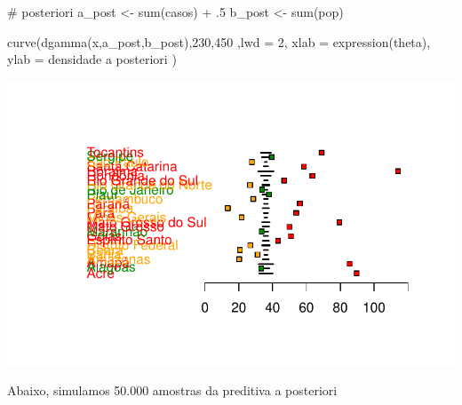\documentclass[
  letterpaper,
  DIV=11,
  numbers=noendperiod]{scrreprt}
\newenvironment{Shaded}{\begin{snugshade}}{\end{snugshade}}
\newcommand{\AttributeTok}[1]{\textcolor[rgb]{0.40,0.45,0.13}{#1}}
\newcommand{\CommentTok}[1]{\textcolor[rgb]{0.37,0.37,0.37}{#1}}
\newcommand{\DecValTok}[1]{\textcolor[rgb]{0.68,0.00,0.00}{#1}}
\newcommand{\FunctionTok}[1]{\textcolor[rgb]{0.28,0.35,0.67}{#1}}
\newcommand{\NormalTok}[1]{\textcolor[rgb]{0.00,0.23,0.31}{#1}}
\newcommand{\OtherTok}[1]{\textcolor[rgb]{0.00,0.23,0.31}{#1}}
\newcommand{\SpecialCharTok}[1]{\textcolor[rgb]{0.37,0.37,0.37}{#1}}
\newcommand{\StringTok}[1]{\textcolor[rgb]{0.13,0.47,0.30}{#1}}
\theoremstyle{definition}
\theoremstyle{definition}
\theoremstyle{plain}
\theoremstyle{remark}
\begin{document}
\begin{Shaded}
\begin{Highlighting}[]
\CommentTok{\# posteriori}
\NormalTok{a\_post }\OtherTok{\textless{}{-}} \FunctionTok{sum}\NormalTok{(casos) }\SpecialCharTok{+}\NormalTok{ .}\DecValTok{5}
\NormalTok{b\_post }\OtherTok{\textless{}{-}} \FunctionTok{sum}\NormalTok{(pop)}

\FunctionTok{curve}\NormalTok{(}\FunctionTok{dgamma}\NormalTok{(x,a\_post,b\_post),}\DecValTok{230}\NormalTok{,}\DecValTok{450}\NormalTok{ ,}\AttributeTok{lwd =} \DecValTok{2}\NormalTok{, }\AttributeTok{xlab =} \FunctionTok{expression}\NormalTok{(theta), }\AttributeTok{ylab =} \StringTok{\textquotesingle{}densidade a posteriori\textquotesingle{}}\NormalTok{ )}
\end{Highlighting}
\end{Shaded}

\includegraphics{poisson_files/figure-pdf/unnamed-chunk-5-1.pdf}

Abaixo, simulamos 50.000 amostras da preditiva a posteriori
\end{document}
